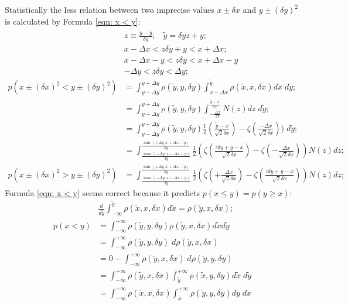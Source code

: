 \documentclass[twoside]{article}
\numberwithin{equation}{section}
\newcommand{\eqspace}{\;\;\;}
\begin{document}
\iffalse

Statistically the less relation between two imprecise values $x \pm \delta x$ and $y \pm (\delta y)^2$ is calculated by Formula \ref{eqn: x < y}:
\begin{align}
& z \equiv \frac{\tilde{y} - y}{\delta y}; \eqspace \tilde{y} = \delta y z + y; \\
& x - \Delta x < z \delta y + y < x + \Delta x; \\ & x - \Delta x - y < z \delta y < x + \Delta x - y \\
& - \Delta y < z \delta y < \Delta y; \\
p\left( x \pm (\delta x)^2 < y \pm (\delta y)^2 \right) & = 
  \int_{y - \Delta y}^{y + \Delta y} \rho(\tilde{y}, y, \delta y) 
    \int_{x - \Delta x}^{\tilde{y}} \rho(\tilde{x}, x, \delta x) d \tilde{x} \;d \tilde{y}; \\
& = \int_{y - \Delta y}^{y + \Delta y} \rho(\tilde{y}, y, \delta y) 
  \int_{-\frac{\Delta x}{\delta x}}^{\frac{\tilde{y} - x}{\delta x}} N(z) d z \;d \tilde{y}; \\
& = \int_{y - \Delta y}^{y + \Delta y} \rho(\tilde{y}, y, \delta y) 
      \frac{1}{2}(\frac{\tilde{y} - x}{\sqrt{2} \delta x}) - \zeta(\frac{-\Delta x}{\sqrt{2} \delta x})) \;d \tilde{y}; \\
& = \int_{\frac{\max(-\Delta y, x - \Delta x - y)}{\delta y}}^{\frac{\min(+\Delta y, x + \Delta x - y)}{\delta y}} 
      \frac{1}{2} \left(\zeta(\frac{z \delta y + y - x}{\sqrt{2} \delta x}) - \zeta(-\frac{\Delta x}{\sqrt{2} \delta x})\right) N(z) d z; \\
p\left( x \pm (\delta x)^2 > y \pm (\delta y)^2 \right) & =     
   \int_{\frac{\max(-\Delta y, x - \Delta x - y)}{\delta y}}^{\frac{\min(+\Delta y, x + \Delta x - y)}{\delta y}} 
      \frac{1}{2} \left(\zeta(+\frac{\Delta x}{\sqrt{2} \delta x}) - \zeta(\frac{z \delta y + y - x}{\sqrt{2} \delta x})\right) N(z) d z;
\end{align}
Formula \eqref{eqn: x < y} seems correct because it predicts $p(x \le y) = p(y \ge x)$:
\begin{align}
& \frac{d}{d \tilde{y}} \int_{-\infty}^{\tilde{y}} \rho(\tilde{x}, x, \delta x) d \tilde{x} = \rho(\tilde{y}, x, \delta x); \\
p(x< y) & = \int_{-\infty}^{+\infty} \rho(\tilde{y}, y, \delta y) \rho(\tilde{y}, x, \delta x) d \tilde{x} d \tilde{y} \\
& = \int_{-\infty}^{+\infty} \rho(\tilde{y}, y, \delta y) \;d \rho(\tilde{y}, x, \delta x) \\
& = 0 - \int_{-\infty}^{+\infty} \rho(\tilde{y}, x, \delta x) \;d \rho(\tilde{y}, y, \delta y) \\
& = \int_{-\infty}^{+\infty} \rho(\tilde{y}, x, \delta x) 
\int_{\tilde{y}}^{+\infty} \rho(\tilde{x}, y, \delta y) 
d \tilde{x} \;d \tilde{y} \\
& = \int_{-\infty}^{+\infty} \rho(\tilde{x}, x, \delta x) 
\int_{\tilde{x}}^{+\infty} \rho(\tilde{y}, y, \delta y) 
d \tilde{y} \;d \tilde{x}
\end{align}
\end{document}
